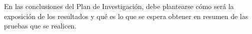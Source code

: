 En las conclusiones del Plan de Investigación, debe plantearse cómo será la exposición de los resultados y qué es lo que se espera obtener en resumen de las pruebas que se realicen.